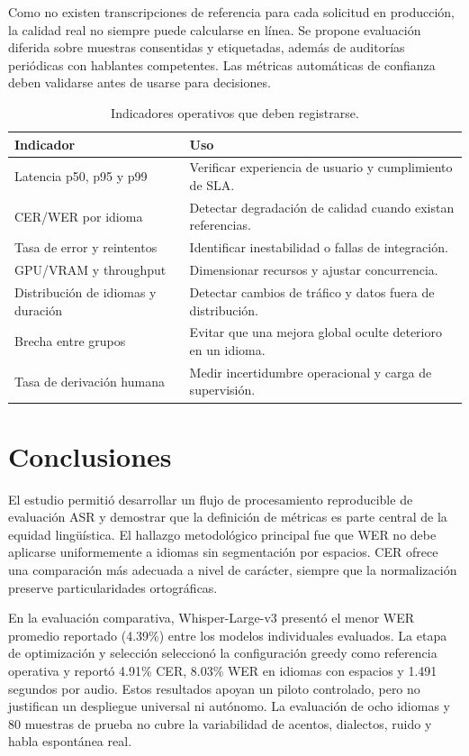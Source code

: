 \documentclass[11pt,letterpaper]{article}
\begin{document}
Como no existen transcripciones de referencia para cada solicitud en producción, la calidad real no siempre puede calcularse en línea. Se propone evaluación diferida sobre muestras consentidas y etiquetadas, además de auditorías periódicas con hablantes competentes. Las métricas automáticas de confianza deben validarse antes de usarse para decisiones.

\begin{table}[H]\centering
\caption{Indicadores operativos que deben registrarse.}
\begin{tabularx}{\textwidth}{lX}\toprule\textbf{Indicador} & \textbf{Uso}\\\midrule
Latencia p50, p95 y p99 & Verificar experiencia de usuario y cumplimiento de SLA.\\
CER/WER por idioma & Detectar degradación de calidad cuando existan referencias.\\
Tasa de error y reintentos & Identificar inestabilidad o fallas de integración.\\
GPU/VRAM y throughput & Dimensionar recursos y ajustar concurrencia.\\
Distribución de idiomas y duración & Detectar cambios de tráfico y datos fuera de distribución.\\
Brecha entre grupos & Evitar que una mejora global oculte deterioro en un idioma.\\
Tasa de derivación humana & Medir incertidumbre operacional y carga de supervisión.\\\bottomrule\end{tabularx}\end{table}

\section{Conclusiones}
El estudio permitió desarrollar un flujo de procesamiento reproducible de evaluación ASR y demostrar que la definición de métricas es parte central de la equidad lingüística. El hallazgo metodológico principal fue que WER no debe aplicarse uniformemente a idiomas sin segmentación por espacios. CER ofrece una comparación más adecuada a nivel de carácter, siempre que la normalización preserve particularidades ortográficas.

En la evaluación comparativa, Whisper-Large-v3 presentó el menor WER promedio reportado (4.39\%) entre los modelos individuales evaluados. La etapa de optimización y selección seleccionó la configuración greedy como referencia operativa y reportó 4.91\% CER, 8.03\% WER en idiomas con espacios y 1.491 segundos por audio. Estos resultados apoyan un piloto controlado, pero no justifican un despliegue universal ni autónomo. La evaluación de ocho idiomas y 80 muestras de prueba no cubre la variabilidad de acentos, dialectos, ruido y habla espontánea real.
\end{document}
